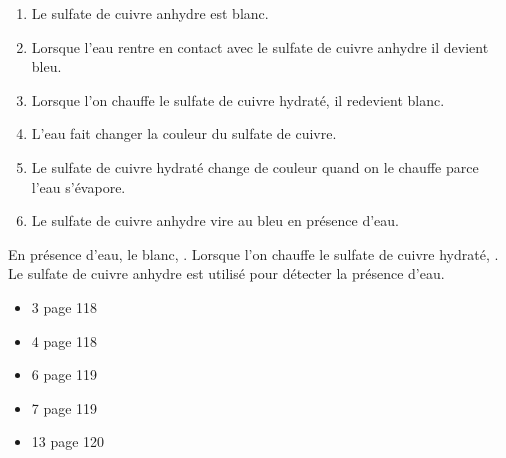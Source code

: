 \documentclass[12pt,a4paper]{article}
\begin{document}
\begin{myact}{}
	\begin{enumerate}
		\item Le sulfate de cuivre anhydre est blanc.
		\item Lorsque l'eau rentre en contact avec le sulfate de cuivre anhydre il devient bleu.
		\item Lorsque l'on chauffe le sulfate de cuivre hydraté, il redevient blanc.
		\item L'eau fait changer la couleur du sulfate de cuivre.
		\item Le sulfate de cuivre hydraté change de couleur quand on le chauffe parce l'eau s'évapore.
		\item Le sulfate de cuivre anhydre vire au bleu en présence d'eau.
	\end{enumerate}
\end{myact}

\begin{mybilan}
	En présence d'eau, le  blanc, .
	Lorsque l'on chauffe le sulfate de cuivre hydraté, .
	Le sulfate de cuivre anhydre est utilisé pour détecter la présence d'eau.
\end{mybilan}

\begin{myexos}
	\begin{itemize}
		\item 3 page 118
		\item 4 page 118
		\item 6 page 119
		\item 7 page 119
		\item 13 page 120
	\end{itemize}
\end{myexos}
\end{document}

